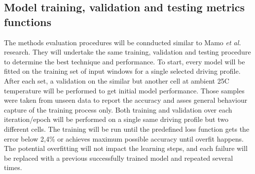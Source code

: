 \subsection{Model training, validation and testing metrics functions}
The methods evaluation procedures will be connducted similar to Mamo \textit{et al.}~\cite{mamo_long_2020} research.
They will undertake the same training, validation and testing procedure to determine the best technique and performance.
%
To start, every model will be fitted on the training set of input windows for a single selected driving profile.
After each set, a validation on the similar but another cell at ambient 25\textdegree{}C temperature will be performed to get initial model performance.
Those samples were taken from unseen data to report the accuracy and asses general behaviour capture of the training process only.
%
Both training and validation over each iteration/epoch will be performed on a single same driving profile but two different cells.
%
The training will be run until the predefined loss function gets the error below 2,4\% or achieves maximum possible accuracy until overfit happens.
The potential overfitting will not impact the learning steps, and each failure will be replaced with a previous successfully trained model and repeated several times.

